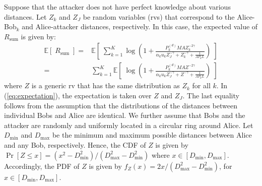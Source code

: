 \documentclass[draftclsnofoot, 12pt, onecolumn, journal]{IEEEtran}
\begin{document}
Suppose that the attacker does not have perfect knowledge about various distances.
Let $Z_k$ and $Z_J$ be random variables (rvs) that correspond to the Alice-Bob$_k$ and Alice-attacker distances, respectively.
In this case, the expected value of $R_{\mathrm{sum}}$ is given by:
%
\begin{align}
\mathbb{E} [ \; R_{\mathrm{sum}} \;] =&  \mathbb{E} \left[ \; \sum_{k=1}^K \log \left( 1 +  \frac{ P_k^{(d)} M A Z_k^{-2\gamma}}{ \alpha_k u_k Z_J^{-\gamma} + Z_k^{-\gamma} + \frac{1}{A P_k L}  } \right) \; \right] \nonumber \\
=& \sum_{k=1}^K \mathbb{E} \left[ \; \log \left( 1 +  \frac{ P_k^{(d)} M A Z^{-2\gamma}}{ \alpha_k u_k Z_J^{-\gamma} + Z^{-\gamma} + \frac{1}{A P_k L}  } \right) \; \right]
\label{eq:expectation}
\end{align}
%
where $Z$ is a generic rv that has the same distribution as $Z_k$ for all $k$.
In (\ref{eq:expectation}), the expectation is taken over $Z$ and $Z_J$.
The last equality follows from the assumption that the distributions of the distances between individual Bobs and Alice are identical.
We further assume that Bobs and the attacker are randomly and uniformly located in a circular ring around Alice.
Let $D_{\mathrm{min}}$ and $D_{\mathrm{max}}$ be the minimum and maximum possible distances between Alice and any Bob, respectively.
Hence, the CDF of $Z$ is given by $\Pr[Z \leq x] = (x^2 - D_{\mathrm{min}}^2)/ (D_{\mathrm{max}}^2 - D_{\mathrm{min}}^2)$ where $x \in [D_{\mathrm{min}}, D_{\mathrm{max}}]$.
Accordingly, the PDF of $Z$ is given by $f_Z(x) = 2x / (D_{\mathrm{max}}^2 - D_{\mathrm{min}}^2)$, for $x \in [D_{\mathrm{min}}, D_{\mathrm{max}}]$.
\end{document}
